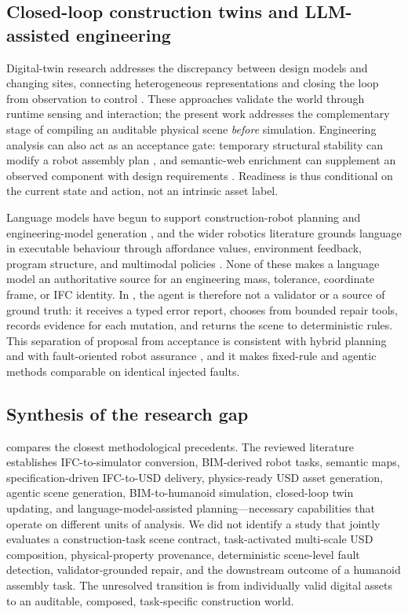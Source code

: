 \subsection{Closed-loop construction twins and LLM-assisted engineering}

Digital-twin research addresses the discrepancy between design models and
changing sites, connecting heterogeneous representations and closing the
loop from observation to control
\cite{boje2020semantic,sacks2020digitaltwin,wang2024closeddt,tuomisto2026inspection,akhavian2026bim2rdt}.
These approaches validate the world through runtime sensing and interaction;
the present work addresses the complementary stage of compiling an auditable
physical scene \emph{before} simulation. Engineering analysis can also act
as an acceptance gate: temporary structural stability can modify a robot
assembly plan \cite{xu2025fem}, and semantic-web enrichment can supplement
an observed component with design requirements \cite{zhu2025perception}.
Readiness is thus conditional on the current state and action, not an
intrinsic asset label.

Language models have begun to support construction-robot planning and
engineering-model generation
\cite{you2023robogpt,xu2024physics,akhavian2026bim2rdt}, and the wider
robotics literature grounds language in executable behaviour through
affordance values, environment feedback, program structure, and multimodal
policies
\cite{ahn2022saycan,huang2022innermonologue,liang2023code,singh2023progprompt,driess2023palme,brohan2023rt2,kannan2023smartllm}.
None of these makes a language model an authoritative source for an
engineering mass, tolerance, coordinate frame, or IFC identity. In
\systemname{}, the agent is therefore not a validator or a source of ground
truth: it receives a typed error report, chooses from bounded repair tools,
records evidence for each mutation, and returns the scene to deterministic
rules. This separation of proposal from acceptance is consistent with hybrid
planning \cite{lin2025asp} and with fault-oriented robot assurance
\cite{frasheri2023safer}, and it makes fixed-rule and agentic methods
comparable on identical injected faults.

\subsection{Synthesis of the research gap}

 compares the closest methodological precedents. The
reviewed literature establishes IFC-to-simulator conversion, BIM-derived
robot tasks, semantic maps, specification-driven IFC-to-USD delivery,
physics-ready USD asset generation, agentic scene generation,
BIM-to-humanoid simulation, closed-loop twin updating, and
language-model-assisted planning---necessary capabilities that operate on
different units of analysis. We did not identify a study that jointly
evaluates a construction-task scene contract, task-activated multi-scale USD
composition, physical-property provenance, deterministic scene-level fault
detection, validator-grounded repair, and the downstream outcome of a
humanoid assembly task. The unresolved transition is from individually valid
digital assets to an auditable, composed, task-specific construction world.

